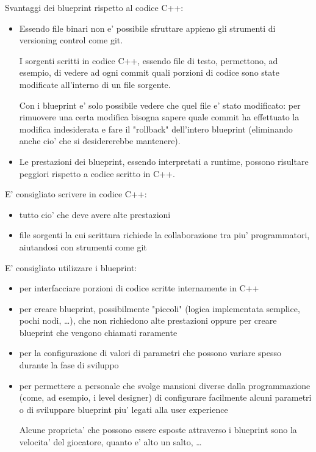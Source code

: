         Svantaggi dei blueprint rispetto al codice C++:
        \begin{itemize}
            \item Essendo file binari non e' possibile sfruttare appieno gli strumenti di versioning control come git.

                I sorgenti scritti in codice C++, essendo file di testo, permettono, ad esempio, di vedere ad ogni commit quali porzioni di codice sono state modificate all'interno di un file sorgente.

                Con i blueprint e' solo possibile vedere che quel file e' stato modificato: per rimuovere una certa modifica bisogna sapere quale commit ha effettuato la modifica indesiderata e fare il "rollback" dell'intero blueprint (eliminando anche cio' che si desidererebbe mantenere).

            \item Le prestazioni dei blueprint, essendo interpretati a runtime, possono risultare peggiori rispetto a codice scritto in C++.
        \end{itemize}

        E' consigliato scrivere in codice C++:
        \begin{itemize}
            \item tutto cio' che deve avere alte prestazioni
            \item file sorgenti la cui scrittura richiede la collaborazione tra piu' programmatori, aiutandosi con strumenti come git
        \end{itemize}

        E' consigliato utilizzare i blueprint:
        \begin{itemize}
            \item per interfacciare porzioni di codice scritte internamente in C++
            \item per creare blueprint, possibilmente "piccoli" (logica implementata semplice, pochi nodi, \dots), che non richiedono alte prestazioni oppure per creare blueprint che vengono chiamati raramente
            \item per la configurazione di valori di parametri che possono variare spesso durante la fase di sviluppo
            \item per permettere a personale che svolge mansioni diverse dalla programmazione (come, ad esempio, i level designer) di configurare facilmente alcuni parametri o di sviluppare blueprint piu' legati alla user experience

                \begin{notebox}
                    Alcune proprieta' che possono essere esposte attraverso i blueprint sono la velocita' del giocatore, quanto e' alto un salto, \dots
                \end{notebox}
        \end{itemize}
